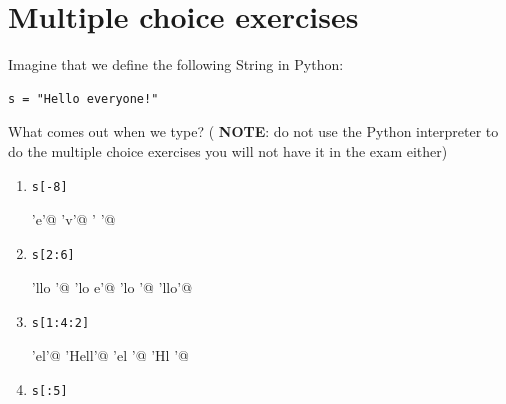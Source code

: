 \section*{Multiple choice exercises}


Imagine that we define the following String in Python:

\begin{Verbatim}
s = "Hello everyone!"
\end{Verbatim}

\noindent What comes out when we type? ({\color{deepred} \textbf{NOTE}: do not use the Python interpreter to do the multiple choice exercises you will not have it in the exam either})\\


\begin{enumerate}
\item
\begin{Verbatim}
s[-8]
\end{Verbatim}

\begin{choices}
    \choice \verb@'e'@
    \choice \verb@'v'@
    \choice \verb@' '@
    \choice \verb@IndexError@
\end{choices}


\item 
\begin{Verbatim}
s[2:6]
\end{Verbatim}

\begin{choices}
    \choice \verb@'llo '@
    \choice \verb@'lo e'@
    \choice \verb@'lo '@
    \choice \verb@'llo'@
\end{choices}




\item 
\begin{Verbatim}
s[1:4:2]
\end{Verbatim}

\begin{choices}
    \choice \verb@'el'@
    \choice \verb@'Hell'@
    \choice \verb@'el '@
    \choice \verb@'Hl '@
\end{choices}



\item 
\begin{Verbatim}
s[:5]
\end{Verbatim}


\end{enumerate}
